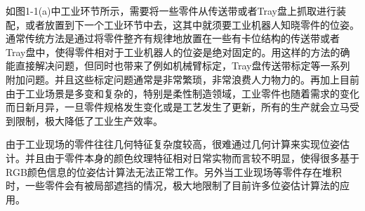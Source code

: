 如图1-1(a)中工业环节所示，需要将一些零件从传送带或者Tray盘上抓取进行装配，或者放置到下一个工业环节中去，这其中就须要工业机器人知晓零件的位姿。通常传统方法是通过将零件整齐有规律地放置在一些有卡位结构的传送带或者Tray盘中，使得零件相对于工业机器人的位姿是绝对固定的。用这样的方法的确能直接解决问题，但同时也带来了例如机械臂标定，Tray盘传送带标定等一系列附加问题。并且这些标定问题通常是非常繁琐，非常浪费人力物力的。再加上目前由于工业场景是多变和复杂的，特别是柔性制造领域，工业零件也随着需求的变化而日新月异，一旦零件规格发生变化或是工艺发生了更新，所有的生产就会立马受到限制，极大降低了工业生产效率。

由于工业现场的零件往往几何特征复杂度较高，很难通过几何计算来实现位姿估计。并且由于零件本身的颜色纹理特征相对日常实物而言较不明显，使得很多基于RGB颜色信息的位姿估计算法无法正常工作。另外当工业现场等零件存在堆积时，一些零件会有被局部遮挡的情况，极大地限制了目前许多位姿估计算法的应用。


